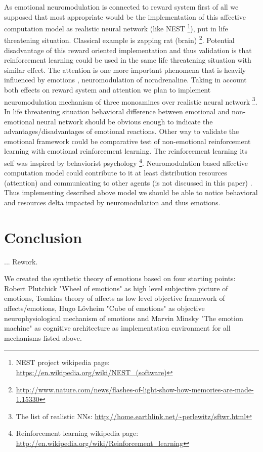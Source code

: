 As emotional neuromodulation is connected to reward system \cite{neuromodulatory, emotionsbraintorobot, primer_affect_psychology, appraisal_considered_as_a_process, computationalmodelsemotion, dont_worry_be_happy} first of all we supposed that most appropriate would be the implementation of this affective computation model as realistic neural network (like NEST \footnote{NEST project wikipedia page: \url{https://en.wikipedia.org/wiki/NEST_(software)}}), put in life threatening situation. Classical example is zapping rat (brain) \footnote{\url{http://www.nature.com/news/flashes-of-light-show-how-memories-are-made-1.15330}}. Potential disadvantage of this reward oriented implementation and thus validation is that reinforcement learning could be used in the same life threatening situation with similar effect. The attention is one more important phenomena that is heavily influenced by emotions \cite{neuromodulatory, on_role_of_emotion, emotionsbraintorobot}, neuromodulation of noradrenaline. Taking in account both effects on reward system and attention we plan to implement neuromodulation mechanism of three monoamines over realistic neural network \footnote{The list of realistic NNs: \url{http://home.earthlink.net/~perlewitz/sftwr.html}}. In life threatening situation behavioral difference between emotional and non-emotional neural network should be obvious enough to indicate the advantages/disadvantages of emotional reactions. Other way to validate the emotional framework could be comparative test of non-emotional reinforcement learning with emotional reinforcement learning. The reinforcement learning its self was inspired by behaviorist psychology \footnote{Reinforcement learning wikipedia page: \url{http://en.wikipedia.org/wiki/Reinforcement_learning}}. Neuromodulation based affective computation model could contribute to it at least distribution resources (attention) and communicating to other agents (is not discussed in this paper) \cite{on_role_of_emotion}. Thus implementing described above model we should be able to notice behavioral and resources delta impacted by neuromodulation and thus emotions.


\section{Conclusion}

... Rework.

We created the synthetic theory of emotions based on four starting points: Robert Plutchick "Wheel of emotions" \cite{natureofemotions, senticcomputing} as high level subjective picture of emotions, Tomkins theory of affects \cite{primer_affect_psychology} as low level objective framework of affects/emotions, Hugo L\"{o}vheim "Cube of emotions" \cite{cubeofemotions} as objective neurophysiological mechanism of emotions and Marvin Minsky "The emotion machine" \cite{emotionmachine} as cognitive architecture as implementation environment for all mechanisms listed above.

